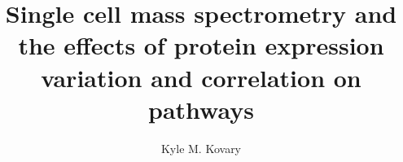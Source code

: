 \documentclass[12pt]{report}
\begin{document}
\title{Single cell mass spectrometry and the effects of protein expression variation and correlation on pathways}
\author{Kyle M. Kovary}
 

\beforepreface
%

\afterpreface



\renewcommand\thefigure{\thechapter.\arabic{figure}}    
\setcounter{figure}{0}  


% 



\onlinesignature
\end{document}
